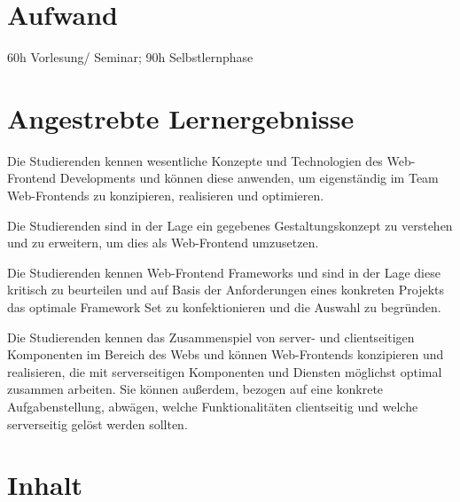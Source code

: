 \hypertarget{aufwandpathlabelmi-2017modulbeschreibungen-bachelorba_wd_frontend-development}{%
\section*{Aufwand\label{/mi-2017/modulbeschreibungen-bachelor/BA_WD_Frontend-Development}}\label{aufwandpathlabelmi-2017modulbeschreibungen-bachelorba_wd_frontend-development}}

60h Vorlesung/ Seminar; 90h Selbstlernphase

\hypertarget{angestrebte-lernergebnissepathlabelmi-2017modulbeschreibungen-bachelorba_wd_frontend-development}{%
\section*{Angestrebte
Lernergebnisse\label{/mi-2017/modulbeschreibungen-bachelor/BA_WD_Frontend-Development}}\label{angestrebte-lernergebnissepathlabelmi-2017modulbeschreibungen-bachelorba_wd_frontend-development}}

Die Studierenden kennen wesentliche Konzepte und Technologien des
Web-Frontend Developments und können diese anwenden, um eigenständig im
Team Web-Frontends zu konzipieren, realisieren und optimieren.

Die Studierenden sind in der Lage ein gegebenes Gestaltungskonzept zu
verstehen und zu erweitern, um dies als Web-Frontend umzusetzen.

Die Studierenden kennen Web-Frontend Frameworks und sind in der Lage
diese kritisch zu beurteilen und auf Basis der Anforderungen eines
konkreten Projekts das optimale Framework Set zu konfektionieren und die
Auswahl zu begründen.

Die Studierenden kennen das Zusammenspiel von server- und clientseitigen
Komponenten im Bereich des Webs und können Web-Frontends konzipieren und
realisieren, die mit serverseitigen Komponenten und Diensten möglichst
optimal zusammen arbeiten. Sie können außerdem, bezogen auf eine
konkrete Aufgabenstellung, abwägen, welche Funktionalitäten clientseitig
und welche serverseitig gelöst werden sollten.

\hypertarget{inhaltpathlabelmi-2017modulbeschreibungen-bachelorba_wd_frontend-development}{%
\section*{Inhalt\label{/mi-2017/modulbeschreibungen-bachelor/BA_WD_Frontend-Development}}\label{inhaltpathlabelmi-2017modulbeschreibungen-bachelorba_wd_frontend-development}}

